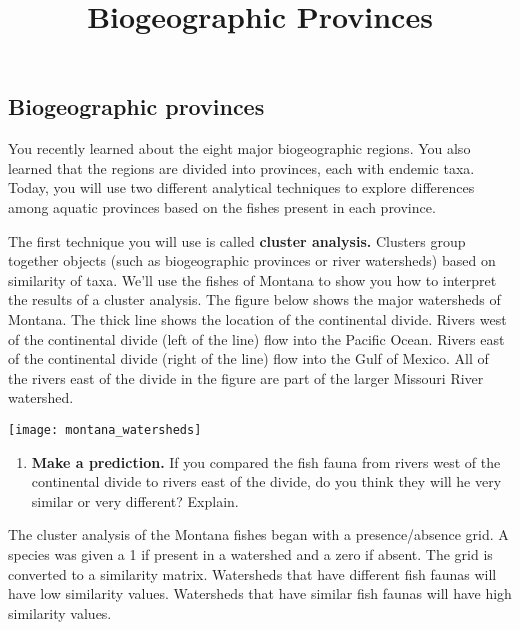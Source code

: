 \documentclass[11pt]{article}
\title{Biogeographic Provinces}
\author{}
\date{}                                           %
\begin{document}
\thispagestyle{first_page}

\subsection*{Biogeographic provinces}

You recently learned about the eight major biogeographic regions. 
You also learned that the regions are divided into provinces, each with
endemic taxa.  Today, you will use two different analytical techniques to explore 
differences among aquatic provinces based on the fishes present in each 
province.

The first technique you will use is called \textbf{cluster analysis.} Clusters
group together objects (such as biogeographic provinces or river watersheds)
based on similarity of taxa. We'll use the fishes of Montana to show you
how to interpret the results of a cluster analysis.  The figure below shows the
major watersheds of Montana.  The thick line shows the location of the
continental divide. Rivers west of the continental divide (left of the line)
flow into the Pacific Ocean. Rivers east of the continental divide (right
of the line) flow into the Gulf of Mexico.  All of the rivers east of the divide
in the figure are part of the larger Missouri River watershed.

\begin{center}
	\texttt{[image: montana\_watersheds]}
\end{center}

\begin{enumerate}[leftmargin=*]
\item \textbf{Make a prediction.} If you compared the fish fauna from 
rivers west of the continental divide  to rivers east of the divide, do you think
they will he very similar or very different? Explain.%
\end{enumerate}


\newpage

The cluster analysis of the Montana fishes began with a presence/absence
grid. A species was given a 1 if present in a watershed and a zero if absent. 
The grid is converted to a similarity matrix. Watersheds that have different
fish faunas will have low similarity values. Watersheds that have similar fish 
faunas will have high similarity values.  
\end{document}
